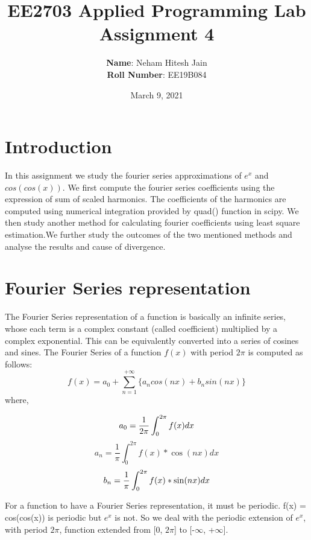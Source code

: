 \documentclass{article}
\title{EE2703 Applied Programming Lab \\ Assignment 4}
\author{
  \textbf{Name}: Neham Hitesh Jain\\
  \textbf{Roll Number}: EE19B084
}\date{March 9, 2021}
\begin{document}
\maketitle
\newpage

\section{Introduction}


In this assignment we study the fourier series approximations of $e^x$ and $cos(cos(x))$. We first
compute the fourier series coefficients using the expression of sum of scaled harmonics. The
coefficients of the harmonics are computed using numerical integration provided by quad()
function in scipy. We then study another method for calculating fourier coefficients using least
square estimation.We further study the outcomes of the two mentioned methods and analyse
the results and cause of divergence.

\section{Fourier Series representation}


The Fourier Series representation of a function is basically an infinite series, whose each term is a complex constant (called coefficient) multiplied by a complex exponential. This can be equivalently converted into a series of cosines and sines.
\newline
\newline
\noindent
The Fourier Series of a function $f(x)$ with period $2\pi$ is computed as follows:
\begin{equation}
    f(x) = a_0 + \sum_{n=1}^{+\infty}\{ a_ncos(nx) +b_nsin(nx)\}
\end{equation}
\newline
where, 

\begin{equation}
    a_0 = \frac{1}{2\pi} \int_0^{2\pi}f(x)dx\\
\end{equation}
\begin{equation}
    a_n = \frac{1}{\pi} \int_0^{2\pi}f(x)*\cos(nx)dx
\end{equation}
\begin{equation}
    b_n = \frac{1}{\pi} \int_0^{2\pi}f(x)*\sin(nx)dx\\
\end{equation}
    
 For a function to have a Fourier Series representation, it must be periodic. f(x) = cos(cos(x)) is periodic but $e^x$ is not. So we deal with the periodic extension of $e^x$, with period $2\pi$, function extended from [0, $2\pi$] to [-$\infty$, +$\infty$].
\end{document}
